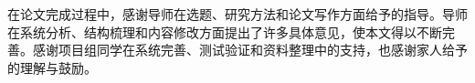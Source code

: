 
在论文完成过程中，感谢导师在选题、研究方法和论文写作方面给予的指导。导师在系统分析、结构梳理和内容修改方面提出了许多具体意见，使本文得以不断完善。感谢项目组同学在系统完善、测试验证和资料整理中的支持，也感谢家人给予的理解与鼓励。
